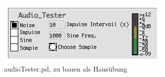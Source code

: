 \begin{figure}[H]
	\begin{center}
		\includegraphics[scale = 1]{img/audioTester.png}
		\caption{audioTester.pd, zu bauen als Hausübung}
		\label{fig:audiotester}
	\end{center}
\end{figure}

